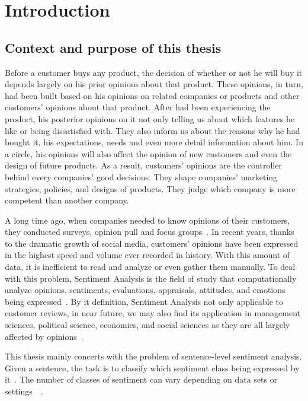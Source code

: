 \hypertarget{chap:intro}{\chapter{Introduction}}
\section{Context and purpose of this thesis}
Before a customer buys any product, the decision of whether or not he will buy it depends largely on his prior opinions about that product. 
These opinions, in turn, had been built based on his opinions on related companies or products and other customers' opinions about that product.  
After had been experiencing the product, his posterior opinions on it not only telling us about which features he like or being dissatisfied with.
They also inform us about the reasons why he had bought it, his expectations, needs and even more detail information about him.
In a circle, his opinions will also affect the opinion of new customers and even the design of future products.
As a result, customers' opinions are the controller behind every companies' good decisions. 
They shape companies' marketing strategies, policies, and designs of products.
They judge which company is more competent than another company.

A long time ago, when companies needed to know opinions of their customers, they conducted surveys, opinion pull and focus groups~\cite{liu2012sentiment}. 
In recent years, thanks to the dramatic growth of social media, customers' opinions have been expressed in the highest speed and volume ever recorded in history.
With this amount of data, it is inefficient to read and analyze or even gather them manually.
To deal with this problem, Sentiment Analysis is the field of study that computationally analyze opinions, sentiments, evaluations, appraisals, attitudes, and emotions being expressed~\cite{liu2012sentiment}.
By it definition, Sentiment Analysis not only applicable to customer reviews, in near future, we may also find its application in management sciences, political science, economics, and social sciences as they are all largely affected by opinions~\cite{liu2012sentiment}. 

This thesis mainly concerts with the problem of sentence-level sentiment analysis. 
Given a sentence, the task is to classify which sentiment class being expressed by it~\cite{liu2012sentiment}.
The number of classes of sentiment can vary depending on data sets or settings~\cite{Rotten-Tomato}~\cite{socher2013recursive}.

